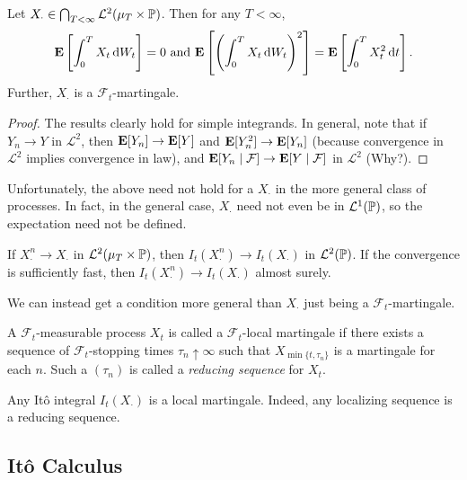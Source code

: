 \begin{lemma}
	Let $X_\cdot \in \bigcap_{T < \infty} \mathcal{L}^2(\mu_T\times\mathbb{P})$. Then for any $T<\infty$,
	\[ \textbf{E}\left[\int_0^T X_t\operatorname{d}\!{W}_t\right] = 0 \text{ and } \textbf{E}\left[\left(\int_0^T X_t\operatorname{d}\!{W}_t\right)^2\right] = \textbf{E}\left[\int_0^T X_t^2\operatorname{d}\!{t}\right]. \]
	Further, $X_\cdot$ is a $\mathcal{F}_t$-martingale.
\end{lemma}
\begin{proof}
	The results clearly hold for simple integrands. In general, note that if $Y_n \to Y$ in $\mathcal{L}^2$, then $\textbf{E}[Y_n] \to \textbf{E}[Y]$ and $\textbf{E}[Y_n^2] \to \textbf{E}[Y_n]$ (because convergence in $\mathcal{L}^2$ implies convergence in law), and $\textbf{E}[Y_n \mid \mathcal{F}] \to \textbf{E}[Y \mid \mathcal{F}]$ in $\mathcal{L}^2$ (Why?).
\end{proof}

Unfortunately, the above need not hold for a $X_\cdot$ in the more general class of processes. In fact, in the general case, $X_\cdot$ need not even be in $\mathcal{L}^1(\mathbb{P})$, so the expectation need not be defined.

\begin{corollary}
	If $X_\cdot^n \to X_\cdot$ in $\mathcal{L}^2(\mu_T\times\mathbb{P})$, then $I_t(X^n_\cdot) \to I_t(X_\cdot)$ in $\mathcal{L}^2(\mathbb{P})$. If the convergence is sufficiently fast, then $I_t(X_\cdot^n) \to I_t(X_\cdot)$ almost surely.
\end{corollary}

We can instead get a condition more general than $X_\cdot$ just being a $\mathcal{F}_t$-martingale.

\begin{definition}
	A $\mathcal{F}_t$-measurable process $X_t$ is called a $\mathcal{F}_t$-local martingale if there exists a sequence of $\mathcal{F}_t$-stopping times $\tau_n\uparrow\infty$ such that $X_{\min\{t,\tau_n\}}$ is a martingale for each $n$. Such a $(\tau_n)$ is called a \textit{reducing sequence} for $X_t$.
\end{definition}

Any It\^{o} integral $I_t(X_\cdot)$ is a local martingale. Indeed, any localizing sequence is a reducing sequence.

\subsection{It\^{o} Calculus}


